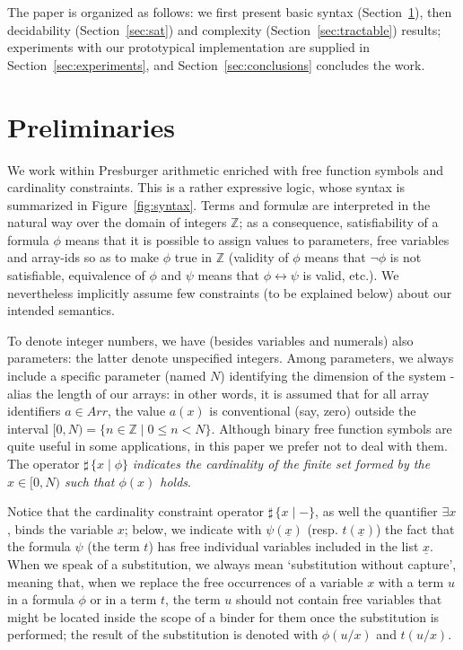 \documentclass[11pt,a4paper]{article}
\newcommand{\formulae}{formul\ae\xspace}
\newcommand{\ux}{\ensuremath{\underline x}}
\begin{document}
The paper is organized as follows: we first present basic syntax (Section~\ref{sec:preliminaries}), then decidability (Section~\ref{sec:sat})  and complexity (Section~\ref{sec:tractable}) results; 
experiments with our prototypical implementation are supplied in Section~\ref{sec:experiments}, and  Section~\ref{sec:conclusions} concludes the work.


\section{Preliminaries}\label{sec:preliminaries}

We work within Presburger arithmetic enriched with free function symbols and cardinality constraints. This is a rather expressive logic, whose syntax is summarized in Figure~\ref{fig:syntax}.
Terms and \formulae are interpreted in the natural way over the domain of integers $\mathbb Z$; as a consequence, satisfiability of a formula $\phi$ means that it is 
possible to assign values to parameters, free variables and array-ids so as to make  $\phi$ true in $\mathbb Z$ 
(validity of $\phi$ means that $\neg \phi$ is not satisfiable, equivalence of $\phi$ and $\psi$ means that $\phi\leftrightarrow \psi$ is valid, etc.). We nevertheless implicitly assume few constraints (to be explained below) 
about our intended semantics.

To denote integer numbers, we have (besides variables and numerals) also
parameters: the latter denote unspecified integers. 
Among parameters, we always include a specific parameter (named $N$) 
identifying
the dimension of the system - 
alias the length of our arrays: in other words, it is assumed that for all array identifiers $a\in Arr$, the value $a(x)$ is  conventional 
(say, zero) outside the interval $[0, N)=\{ n\in \mathbb Z\mid 0\leq n < N\}$.
Although binary free function symbols are quite useful in some applications, in this paper we prefer not
to deal with them.
The operator $\sharp\,\{ x \mid  \phi\}$ \emph{indicates the cardinality of the 
finite set formed by the $x\in [0, N)$ such that $\phi(x)$ holds}.

Notice that the cardinality constraint operator $\sharp\,\{ x \mid -\}$, as 
well the  quantifier $\exists x$, 
binds the variable $x$;   
below, we indicate with $\psi(\ux)$ (resp. $t(\ux)$) the fact that the formula $\psi$ (the term $t$) has free individual variables included in the list $\ux$. 
When we speak of a substitution, we always mean `substitution without capture', meaning that,
when we replace the free occurrences of a variable $x$ with a term $u$ in a formula
$\phi$ or in a term  $t$, 
the term $u$ should not contain free variables that might be located inside  the scope of a 
binder for them once the substitution is performed; the result of the substitution is denoted with $\phi(u/x)$ and $t(u/x)$.
\end{document}
